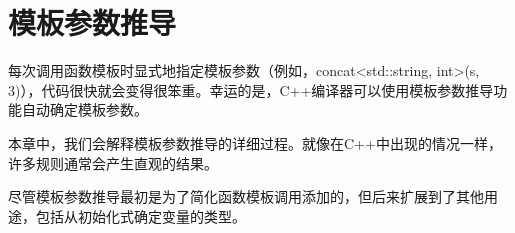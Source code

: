 \chapter{模板参数推导}
每次调用函数模板时显式地指定模板参数（例如，concat<std::string, int>(s, 3)），代码很快就会变得很笨重。幸运的是，C++编译器可以使用模板参数推导功能自动确定模板参数。

本章中，我们会解释模板参数推导的详细过程。就像在C++中出现的情况一样，许多规则通常会产生直观的结果。

尽管模板参数推导最初是为了简化函数模板调用添加的，但后来扩展到了其他用途，包括从初始化式确定变量的类型。












